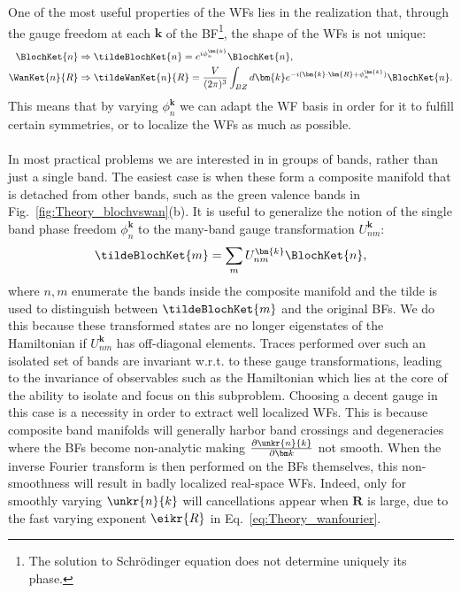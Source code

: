One of the most useful properties of the WFs lies in the realization that, through the gauge freedom at each $\bm{k}$ of the BF\footnote{The solution to Schr\"odinger equation does not determine uniquely its phase.}, the shape of the WFs is not unique:
\begin{align}
	\BlochKet{n} &\Rightarrow \tildeBlochKet{n} = e^{i \phi_n^{\bm{k}}} \BlochKet{n},\\
	\WanKet{n}{R} &\Rightarrow \tildeWanKet{n}{R} = \frac{V}{(2\pi)^3} \int_{BZ} d \bm{k} e^{-i (\bm{k} \cdot \bm{R} + \phi_n^{\bm{k}})} \BlochKet{n}.
\end{align}
This means that by varying $\phi_n^{\bm{k}}$ we can adapt the WF basis in order for it to fulfill certain symmetries, or to localize the WFs as much as possible.
\\\\
In most practical problems we are interested in in groups of bands, rather than just a single band.
The easiest case is when these form a composite manifold that is detached from other bands, such as the green valence bands in Fig.~\ref{fig:Theory_blochvswan}(b).
It is useful to generalize the notion of the single band phase freedom $\phi_n^{\bm k}$ to the many-band gauge transformation $U_{nm}^{\bm k}$:
\begin{equation}
	\label{eq:Theory_Umn}
	\tildeBlochKet{m} = \sum_m U_{nm}^{\bm{k}} \BlochKet{n},
\end{equation}
where $n,m$ enumerate the bands inside the composite manifold and the tilde is used to distinguish between $\tildeBlochKet{m}$ and the original BFs.
We do this because these transformed states are no longer eigenstates of the Hamiltonian if $U_{nm}^{\bm{k}}$ has off-diagonal elements.
Traces performed over such an isolated set of bands are invariant w.r.t. to these gauge transformations, leading to the invariance of observables such as the Hamiltonian which lies at the core of the ability to isolate and focus on this subproblem.
Choosing a decent gauge in this case is a necessity in order to extract well localized WFs.
This is because composite band manifolds will generally harbor band crossings and degeneracies where the BFs become non-analytic making $\frac{\partial \unkr{n}{k}}{\partial \bm k}$ not smooth.
When the inverse Fourier transform is then performed on the BFs themselves, this non-smoothness will result in badly localized real-space WFs.
Indeed, only for smoothly varying $\unkr{n}{k}$ will cancellations appear when $\bm{R}$ is large, due to the fast varying exponent $\eikr{R}$ in Eq.~\eqref{eq:Theory_wanfourier}.
